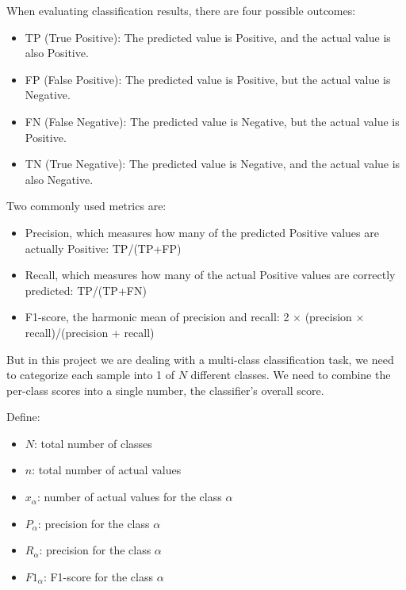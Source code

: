 When evaluating classification results, there are four possible outcomes:
\begin{itemize}
\item TP (True Positive): The predicted value is Positive, and the actual value is also Positive.
\item FP (False Positive): The predicted value is Positive, but the actual value is Negative.
\item FN (False Negative): The predicted value is Negative, but the actual value is Positive.
\item TN (True Negative): The predicted value is Negative, and the actual value is also Negative.
\end{itemize}
Two commonly used metrics are:
\begin{itemize}
    \item Precision, which measures how many of the predicted Positive values are actually Positive: TP/(TP+FP)
    \item Recall, which measures how many of the actual Positive values are correctly predicted: TP/(TP+FN)
    \item F1-score, the harmonic mean of precision and recall: 2 \(\times\) (precision \(\times\) recall)/(precision + recall)
\end{itemize}

But in this project we are dealing with a multi-class classification task, we need to categorize each sample into 1 of \(N\) different classes. We need to combine the per-class scores into a single number, the classifier's overall score.

Define:
\begin{itemize}
    \item \(N\): total number of classes
    \item \(n\): total number of actual values
    \item \(x_\alpha\): number of actual values for the class \(\alpha\)
    \item \(P_\alpha\): precision for the class \(\alpha\)%
    \item \(R_\alpha\): precision for the class \(\alpha\)%
    \item \(F1_\alpha\): F1-score for the class \(\alpha\)
\end{itemize} 


